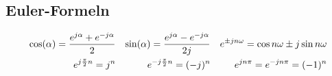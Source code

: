 \newpage


\begin{multicols}{2}
	
	

	\columnbreak
	
		
	
\end{multicols}

	
\subsection{Euler-Formeln}
\begin{align}
	\cos(\alpha) = \frac{e^{j\alpha} + e^{-j\alpha}}{2}
	&& \sin(\alpha) = \frac{e^{j\alpha} - e^{-j\alpha}}{2j} && 
	    {e}^{\pm jn\omega} = \cos{n\omega} \pm j \sin{n\omega} \notag\\
	e^{j\frac{\pi}{2}n} = j^n & & e^{-j\frac{\pi}{2}n} = (-j)^n &&
	e^{jn\pi}=e^{-jn\pi}=(-1)^n \notag
\end{align}
	